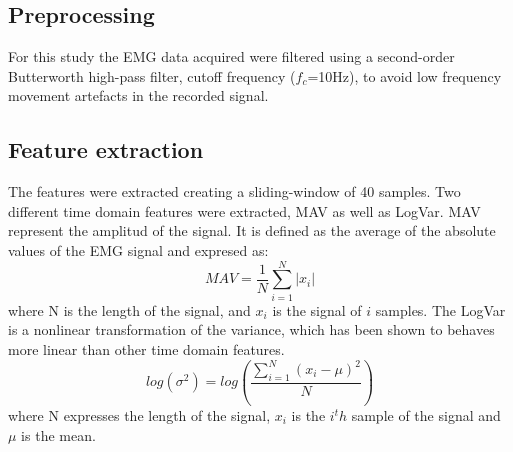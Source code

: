 \documentclass[a4paper, 10pt, conference]{ieeeconf}      %
\begin{document}
	
	
	
	\subsection{Preprocessing}
	For this study the EMG data acquired were filtered using a second-order Butterworth high-pass filter, cutoff frequency ($f_c$=10Hz), to avoid low frequency movement artefacts in the recorded signal.\\
	
	\subsection{Feature extraction}
	The features were extracted creating a sliding-window of 40 samples. %
	Two different time domain features were extracted, MAV as well as LogVar. MAV represent the amplitud of the signal. It is defined as the average of the absolute values of the EMG signal and expresed as:
	\begin{equation}
	MAV = \frac{1}{N}\sum\limits_{i=1}^N|x_i|
	\end{equation}
	where N is the length of the signal, and $x_i$ is the signal of $i$ samples.
	The LogVar is a nonlinear transformation of the variance, which has been shown to behaves more linear than other time domain features. \cite{hanhe2014}
	\begin{equation} \label{eq:logvar}
	log(\sigma^2) = log(\frac{\sum\limits_{i=1}^N(x_i - \mu)^2}{N})
	\end{equation}
	where N expresses the length of the signal, $x_i$ is the $i^th$ sample of the signal and $\mu$ is the mean.
\end{document}
